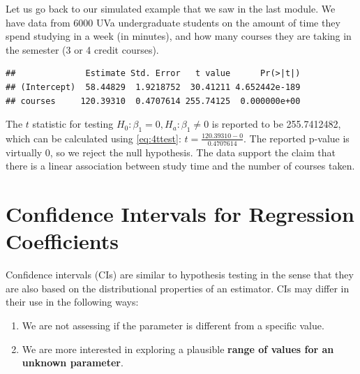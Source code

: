 \documentclass[
]{book}
\newenvironment{Shaded}{\begin{snugshade}}{\end{snugshade}}
\newcommand{\AttributeTok}[1]{\textcolor[rgb]{0.13,0.29,0.53}{#1}}
\newcommand{\DocumentationTok}[1]{\textcolor[rgb]{0.56,0.35,0.01}{\textbf{\textit{#1}}}}
\newcommand{\FunctionTok}[1]{\textcolor[rgb]{0.13,0.29,0.53}{\textbf{#1}}}
\newcommand{\NormalTok}[1]{#1}
\newcommand{\OtherTok}[1]{\textcolor[rgb]{0.56,0.35,0.01}{#1}}
\newcommand{\SpecialCharTok}[1]{\textcolor[rgb]{0.81,0.36,0.00}{\textbf{#1}}}
\providecommand{\tightlist}{%
  \setlength{\itemsep}{0pt}\setlength{\parskip}{0pt}}
\begin{document}
Let us go back to our simulated example that we saw in the last module. We have data from 6000 UVa undergraduate students on the amount of time they spend studying in a week (in minutes), and how many courses they are taking in the semester (3 or 4 credit courses).

\begin{Shaded}
\end{Shaded}

\begin{verbatim}
##              Estimate Std. Error   t value      Pr(>|t|)
## (Intercept)  58.44829  1.9218752  30.41211 4.652442e-189
## courses     120.39310  0.4707614 255.74125  0.000000e+00
\end{verbatim}

The \(t\) statistic for testing \(H_0: \beta_1 = 0, H_a: \beta_1 \neq 0\) is reported to be 255.7412482, which can be calculated using \eqref{eq:4ttest}: \(t= \frac{120.39310 - 0}{0.4707614}\). The reported p-value is virtually 0, so we reject the null hypothesis. The data support the claim that there is a linear association between study time and the number of courses taken.

\section{Confidence Intervals for Regression Coefficients}\label{confidence-intervals-for-regression-coefficients}

Confidence intervals (CIs) are similar to hypothesis testing in the sense that they are also based on the distributional properties of an estimator. CIs may differ in their use in the following ways:

\begin{enumerate}
\def\labelenumi{\arabic{enumi}.}
\tightlist
\item
  We are not assessing if the parameter is different from a specific value.
\item
  We are more interested in exploring a plausible \textbf{range of values for an unknown parameter}.
\end{enumerate}
\end{document}

